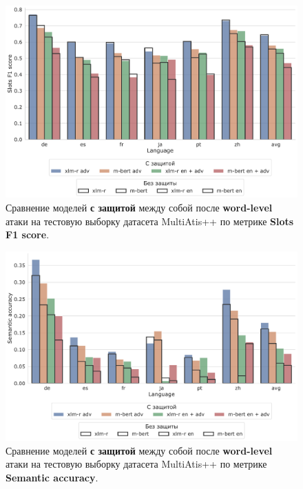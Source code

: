 \begin{figure}[H]
    \centering
    \includegraphics[width=\textwidth]{images/13}
    \caption{Сравнение моделей \textbf{с защитой} между собой после \textbf{word-level} атаки на тестовую выборку датасета MultiAtis++ по метрике \textbf{Slots F1 score}.}\label{fig:figure13}
\end{figure}
\begin{figure}[H]
    \centering
    \includegraphics[width=\textwidth]{images/14}
    \caption{Сравнение моделей \textbf{с защитой} между собой после \textbf{word-level} атаки на тестовую выборку датасета MultiAtis++ по метрике \textbf{Semantic accuracy}.}\label{fig:figure14}
\end{figure}

